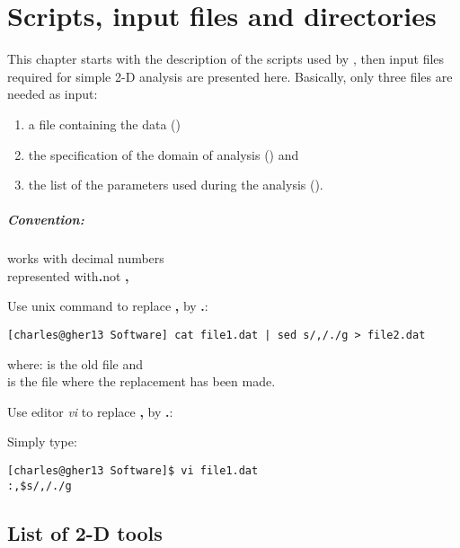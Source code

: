 \chapter{Scripts, input files and directories\label{chap:general}}

This chapter starts with the description of the scripts used by \diva, then input files required for simple 2-D analysis are presented here. 
Basically, only three files are needed as input:

\begin{enumerate}
\item a file containing the data ()
\item the specification of the domain of analysis () and 
\item the list of the parameters used during the analysis ().
\end{enumerate}


\minitoc

\newpage %


\paragraph*{Convention:} \diva works with decimal numbers\\ 
represented with\quad \textbf{.}\quad  not \quad \textbf{,}

\btips
Use unix command  to replace \textbf{,} by \textbf{.}:
\begin{lstlisting}[style=Bash]
[charles@gher13 Software] cat file1.dat | sed s/,/./g > file2.dat
\end{lstlisting}

where:  is the old file and \\
\hphantom{where:}  is the file where the replacement has been made.
\etips


\btips
Use editor \textsl{vi} to replace \textbf{,} by \textbf{.}:

Simply type:
\begin{lstlisting}[style=Bash]
[charles@gher13 Software]$ vi file1.dat
:,$s/,/./g
\end{lstlisting}

\etips



\section{List of 2-D tools}

